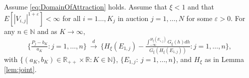 \begin{lemma}\label{lem:joint_first}
Assume \eqref{eq:DomainOfAttraction} holds. Assume that $\xi<1$ and that $E[ |V_{i,j}|^{1+\varepsilon}] <\infty $ for all $i=1\dots,K_j$ in auction $j=1,\dots,N$ for some $\varepsilon >0$. For any $n\in \mathbb{N}$ and as $K\to \infty$,
\begin{equation*}
\big\{\tfrac{P_{j}-b_{K}}{a_{K}}:j=1,\dots,n\big\}~\overset{d}{\to }~\big\{H_{\xi }( E_{1,j}) -\tfrac{ \int_{-\infty}^{H_{\xi }( E_{1,j})} G_{\xi }(h) dh }{G_{\xi }( H_{\xi }( E_{1,j}))} :j=1,\dots,n\big\} ,
\end{equation*}
with $\{(a_{K},b_{K}) \in \mathbb{R}_{++} \times \mathbb{R} :K \in \mathbb{N}\}$, $\{E_{1,j}:~j=1,\dots,n\}$, and $H_{\xi}$ as in Lemma \ref{lem:joint}.
\end{lemma}
